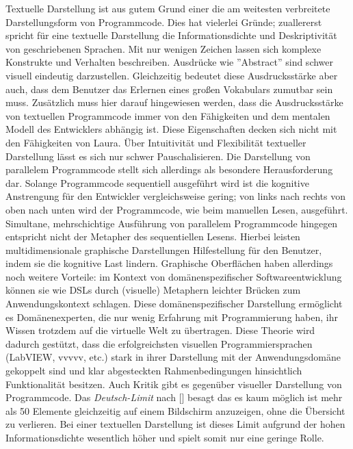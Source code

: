 Textuelle Darstellung ist aus gutem Grund einer die am weitesten verbreitete Darstellungsform von Programmcode. Dies hat vielerlei Gründe; zuallererst spricht für eine textuelle Darstellung die Informationsdichte und Deskriptivität von geschriebenen Sprachen. Mit nur wenigen Zeichen lassen sich komplexe Konstrukte und Verhalten beschreiben. Ausdrücke wie ''Abstract'' sind schwer visuell eindeutig darzustellen.  Gleichzeitig bedeutet diese Ausdrucksstärke aber auch, dass dem Benutzer das Erlernen eines großen Vokabulars zumutbar sein muss. Zusätzlich muss hier darauf hingewiesen werden, dass die Ausdrucksstärke von textuellen Programmcode immer von den Fähigkeiten und dem mentalen Modell des Entwicklers abhängig ist. Diese Eigenschaften decken sich nicht mit den Fähigkeiten von Laura. Über Intuitivität und Flexibilität textueller Darstellung lässt es sich nur schwer Pauschalisieren. Die Darstellung von parallelem Programmcode stellt sich allerdings als besondere Herausforderung dar. Solange Programmcode sequentiell ausgeführt wird ist die kognitive Anstrengung für den Entwickler vergleichsweise gering; von links nach rechts von oben nach unten wird der Programmcode, wie beim manuellen Lesen, ausgeführt. Simultane, mehrschichtige Ausführung von parallelem Programmcode hingegen entspricht nicht der Metapher des sequentiellen Lesens. Hierbei leisten multidimensionale graphische Darstellungen Hilfestellung für den Benutzer, indem sie die kognitive Last lindern. Graphische Oberflächen haben allerdings noch weitere Vorteile: im Kontext von domänenspezifischer Softwareentwicklung können sie wie \acp{DSL} durch (visuelle) Metaphern leichter Brücken zum Anwendungskontext schlagen. Diese domänenspezifischer Darstellung ermöglicht es Domänenexperten, die nur wenig Erfahrung mit Programmierung haben, ihr Wissen trotzdem auf die virtuelle Welt zu übertragen. Diese Theorie wird dadurch gestützt, dass die erfolgreichsten visuellen Programmiersprachen (LabVIEW, vvvvv, etc.) stark in ihrer Darstellung mit der Anwendungsdomäne gekoppelt sind und klar abgesteckten Rahmenbedingungen hinsichtlich Funktionalität besitzen. Auch Kritik gibt es gegenüber visueller Darstellung von Programmcode. Das \textit{Deutsch-Limit} nach [\cite{begel1996logoblocks}] besagt das es kaum möglich ist mehr als 50 Elemente gleichzeitig auf einem Bildschirm anzuzeigen, ohne die Übersicht zu verlieren. Bei einer textuellen Darstellung ist dieses Limit aufgrund der hohen Informationsdichte wesentlich höher und spielt somit nur eine geringe Rolle.

